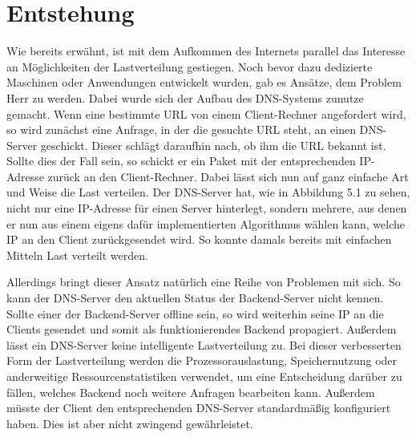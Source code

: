 \section{Entstehung}

Wie bereits erwähnt, ist mit dem Aufkommen des Internets parallel das Interesse an Möglichkeiten der Lastverteilung gestiegen. Noch bevor dazu dedizierte Maschinen oder Anwendungen entwickelt wurden, gab es Ansätze, dem Problem Herr zu werden. Dabei wurde sich der Aufbau des DNS-Systems zunutze gemacht. Wenn eine bestimmte URL von einem Client-Rechner angefordert wird, so wird zunächst eine Anfrage, in der die gesuchte URL steht, an einen DNS-Server geschickt. Dieser schlägt daraufhin nach, ob ihm die URL bekannt ist. Sollte dies der Fall sein, so schickt er ein Paket mit der entsprechenden IP-Adresse zurück an den Client-Rechner. \cite{hong2006dns} Dabei lässt sich nun auf ganz einfache Art und Weise die Last verteilen. Der DNS-Server hat, wie in Abbildung 5.1 zu sehen, nicht nur eine IP-Adresse für einen Server hinterlegt, sondern mehrere, aus denen er nun aus einem eigens dafür implementierten Algorithmus wählen kann, welche IP an den Client zurückgesendet wird. So konnte damals bereits mit einfachen Mitteln Last verteilt werden. 

Allerdings bringt dieser Ansatz natürlich eine Reihe von Problemen mit sich. So kann der DNS-Server den aktuellen Status der Backend-Server nicht kennen. Sollte einer der Backend-Server offline sein, so wird weiterhin seine IP an die Clients gesendet und somit als funktionierendes Backend propagiert. Außerdem lässt ein DNS-Server keine intelligente Lastverteilung zu. Bei dieser verbesserten Form der Lastverteilung werden die Prozessorauslastung, Speichernutzung oder anderweitige Ressourcenstatistiken verwendet, um eine Entscheidung darüber zu fällen, welches Backend noch weitere Anfragen bearbeiten kann. Außerdem müsste der Client den entsprechenden DNS-Server standardmäßig konfiguriert haben. Dies ist aber nicht zwingend gewährleistet.

